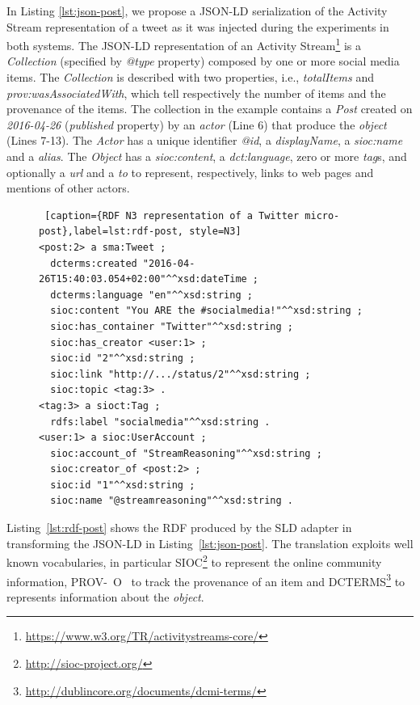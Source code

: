In Listing \ref{lst:json-post}, we propose a JSON-LD serialization of the Activity Stream representation of a tweet as it was injected during the experiments in both systems.  
The JSON-LD representation of an Activity Stream\footnote{\url{https://www.w3.org/TR/activitystreams-core/}} is a \textit{Collection} (specified by \textit{@type} property) composed by one or more social media items. The \textit{Collection} is described with two properties, i.e., \textit{totalItems} and \textit{prov:wasAssociatedWith}, which tell respectively the number of items and the provenance of the items. The collection in the example contains a \textit{Post} created on \textit{2016-04-26} (\textit{published} property) by  an \textit{actor} (Line 6) that produce the \textit{object} (Lines 7-13). 
The \textit{Actor} has a unique identifier  \textit{@id}, a \textit{displayName}, a \textit{sioc:name} and a \textit{alias}. The \textit{Object} has a \textit{sioc:content}, a \textit{dct:language}, zero or more \textit{tag}s, and optionally a \textit{url} and a \textit{to} to represent, respectively, links to web pages and mentions of other actors.

\begin{figure}[ht]
\begin{minipage}{0.95\linewidth}
\begin{lstlisting} [caption={RDF N3 representation of a Twitter micro-post},label=lst:rdf-post, style=N3]
<post:2> a sma:Tweet ;
  dcterms:created "2016-04-26T15:40:03.054+02:00"^^xsd:dateTime ;
  dcterms:language "en"^^xsd:string ;
  sioc:content "You ARE the #socialmedia!"^^xsd:string ;
  sioc:has_container "Twitter"^^xsd:string ;
  sioc:has_creator <user:1> ;
  sioc:id "2"^^xsd:string ;
  sioc:link "http://.../status/2"^^xsd:string ;
  sioc:topic <tag:3> .
<tag:3> a sioct:Tag ;
  rdfs:label "socialmedia"^^xsd:string .
<user:1> a sioc:UserAccount ;
  sioc:account_of "StreamReasoning"^^xsd:string ;
  sioc:creator_of <post:2> ;
  sioc:id "1"^^xsd:string ;
  sioc:name "@streamreasoning"^^xsd:string .
\end{lstlisting}
\end{minipage}
\end{figure}

Listing~\ref{lst:rdf-post} shows the RDF produced by the SLD adapter in transforming the JSON-LD in Listing~\ref{lst:json-post}. The translation exploits well known vocabularies, in particular SIOC\footnote{\url{http://sioc-project.org/}} to represent the online community information, PROV-~O~\cite{w3c-prov-o} to track the provenance of an item and DCTERMS\footnote{\url{http://dublincore.org/documents/dcmi-terms/}} to represents information about the \textit{object}.

